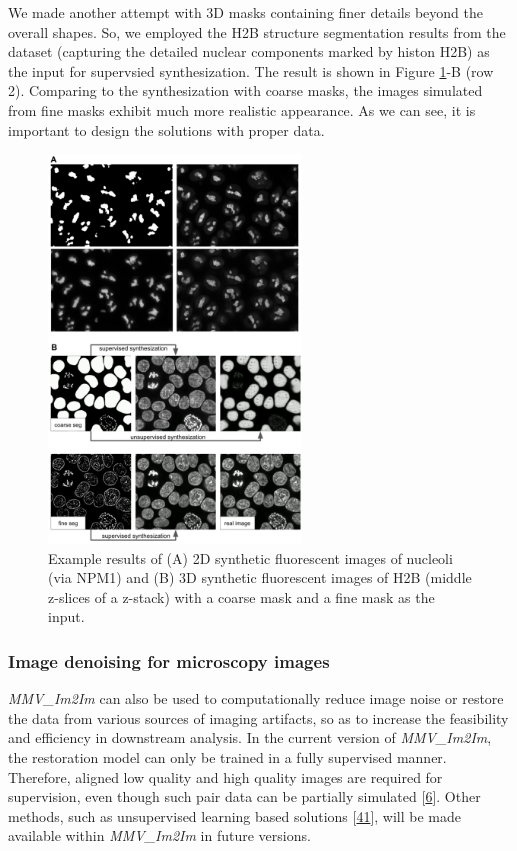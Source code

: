 We made another attempt with 3D masks containing finer details beyond the overall shapes. So, we employed the H2B structure segmentation results from the dataset (capturing the detailed nuclear components marked by histon H2B) as the input for supervsied synthesization. The result is shown in Figure \ref{fig:synthetic}-B (row 2). Comparing to the synthesization with coarse masks, the images simulated from fine masks exhibit much more realistic appearance. As we can see, it is important to design the solutions with proper data.

\begin{figure}
\hypertarget{fig:synthetic}{%
\centering
\includegraphics[width=0.6\textwidth,height=\textheight]{images/synthetic.png}
\caption{Example results of (A) 2D synthetic fluorescent images of nucleoli (via NPM1) and (B) 3D synthetic fluorescent images of H2B (middle z-slices of a z-stack) with a coarse mask and a fine mask as the input.}\label{fig:synthetic}
}
\end{figure}

\hypertarget{image-denoising-for-microscopy-images}{%
\subsubsection{Image denoising for microscopy images}\label{image-denoising-for-microscopy-images}}

\emph{MMV\_Im2Im} can also be used to computationally reduce image noise or restore the data from various sources of imaging artifacts, so as to increase the feasibility and efficiency in downstream analysis. In the current version of \emph{MMV\_Im2Im}, the restoration model can only be trained in a fully supervised manner. Therefore, aligned low quality and high quality images are required for supervision, even though such pair data can be partially simulated {[}\protect\hyperlink{ref-wcCVn8av}{6}{]}. Other methods, such as unsupervised learning based solutions {[}\protect\hyperlink{ref-4vnyY9J9}{41}{]}, will be made available within \emph{MMV\_Im2Im} in future versions.

